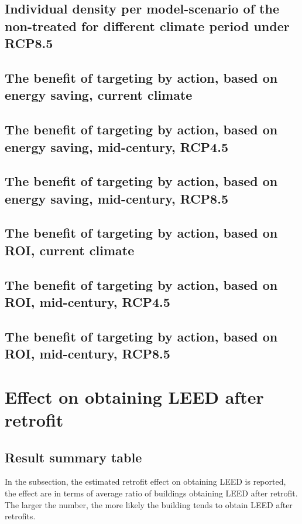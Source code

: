 \documentclass[12pt]{article}
\begin{document}
\subsection{Individual density per model-scenario of the non-treated for different
  climate period under RCP8.5}

\subsection{The benefit of targeting by action, based on energy saving, current climate}

\subsection{The benefit of targeting by action, based on energy saving,
  mid-century, RCP4.5}

\subsection{The benefit of targeting by action, based on energy saving,
  mid-century, RCP8.5}

\subsection{The benefit of targeting by action, based on ROI, current climate}

\subsection{The benefit of targeting by action, based on ROI,
  mid-century, RCP4.5}

\subsection{The benefit of targeting by action, based on ROI,
  mid-century, RCP8.5}

\section{Effect on obtaining LEED after retrofit}
\subsection{Result summary table}
In the subsection, the estimated retrofit effect on obtaining LEED
is reported, the effect are in terms of average ratio of buildings obtaining
LEED after retrofit. The larger the number, the more likely the building tends
to obtain LEED after retrofits.
\end{document}
